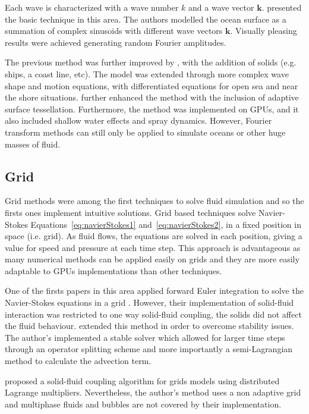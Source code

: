 Each wave is characterized with a wave number $k$ and a wave vector $\mathbf{k}$.
\cite{Tessendorf2001} presented the basic technique in this area.
The authors modelled the ocean surface as a summation of complex sinusoids with different wave vectors $\mathbf{k}$.
Visually pleasing results were achieved generating random Fourier amplitudes.

The previous method was further improved by \cite{Cieutat2003}, with the addition of solids (e.g. ships, a coast line, etc).
The model was extended through more complex wave shape and motion equations, with differentiated equations for open sea and near the shore situations.
\cite{Chiu2006} further enhanced the method with the inclusion of adaptive surface tessellation.
Furthermore, the method was implemented on GPUs, and it also included shallow water effects and spray dynamics.
However, Fourier transform methods can still only be applied to simulate oceans or other huge masses of fluid. 

\subsection{Grid}
\label{gridFluidSolvers}

Grid methods were among the first techniques to solve fluid simulation and so the firsts ones implement intuitive solutions.
Grid based techniques solve Navier-Stokes Equations~\ref{eq:navierStokes1} and~\ref{eq:navierStokes2}, in a fixed position in space (i.e. grid).
As fluid flows, the equations are solved in each position, giving a value for speed and pressure at each time step.
This approach is advantageous as many numerical methods can be applied easily on grids and they are more easily adaptable to GPUs implementations than other techniques.

One of the firsts papers in this area applied forward Euler integration to solve the Navier-Stokes equations in a grid \cite{Foster1996}.
However, their implementation of solid-fluid interaction was restricted to one way solid-fluid coupling, the solids did not affect the fluid behaviour.
\cite{Stam1999} extended this method in order to overcome stability issues.
The author's implemented a stable solver which allowed for larger time steps through an operator splitting scheme and more importantly a semi-Lagrangian method to calculate the advection term.

\cite{Carlson2004} proposed a solid-fluid coupling algorithm for grids models using distributed Lagrange multipliers.
Nevertheless, the author's method uses  a non adaptive grid and multiphase fluids and bubbles are not covered by their implementation.

